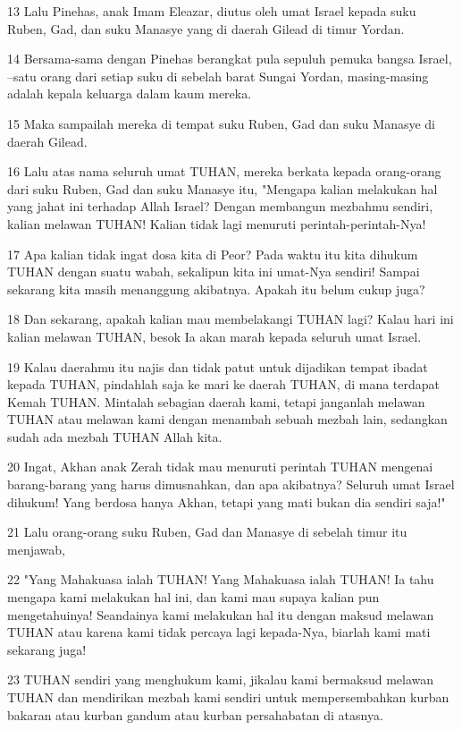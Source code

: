 \par 13 Lalu Pinehas, anak Imam Eleazar, diutus oleh umat Israel kepada suku Ruben, Gad, dan suku Manasye yang di daerah Gilead di timur Yordan.
\par 14 Bersama-sama dengan Pinehas berangkat pula sepuluh pemuka bangsa Israel, --satu orang dari setiap suku di sebelah barat Sungai Yordan, masing-masing adalah kepala keluarga dalam kaum mereka.
\par 15 Maka sampailah mereka di tempat suku Ruben, Gad dan suku Manasye di daerah Gilead.
\par 16 Lalu atas nama seluruh umat TUHAN, mereka berkata kepada orang-orang dari suku Ruben, Gad dan suku Manasye itu, "Mengapa kalian melakukan hal yang jahat ini terhadap Allah Israel? Dengan membangun mezbahmu sendiri, kalian melawan TUHAN! Kalian tidak lagi menuruti perintah-perintah-Nya!
\par 17 Apa kalian tidak ingat dosa kita di Peor? Pada waktu itu kita dihukum TUHAN dengan suatu wabah, sekalipun kita ini umat-Nya sendiri! Sampai sekarang kita masih menanggung akibatnya. Apakah itu belum cukup juga?
\par 18 Dan sekarang, apakah kalian mau membelakangi TUHAN lagi? Kalau hari ini kalian melawan TUHAN, besok Ia akan marah kepada seluruh umat Israel.
\par 19 Kalau daerahmu itu najis dan tidak patut untuk dijadikan tempat ibadat kepada TUHAN, pindahlah saja ke mari ke daerah TUHAN, di mana terdapat Kemah TUHAN. Mintalah sebagian daerah kami, tetapi janganlah melawan TUHAN atau melawan kami dengan menambah sebuah mezbah lain, sedangkan sudah ada mezbah TUHAN Allah kita.
\par 20 Ingat, Akhan anak Zerah tidak mau menuruti perintah TUHAN mengenai barang-barang yang harus dimusnahkan, dan apa akibatnya? Seluruh umat Israel dihukum! Yang berdosa hanya Akhan, tetapi yang mati bukan dia sendiri saja!"
\par 21 Lalu orang-orang suku Ruben, Gad dan Manasye di sebelah timur itu menjawab,
\par 22 "Yang Mahakuasa ialah TUHAN! Yang Mahakuasa ialah TUHAN! Ia tahu mengapa kami melakukan hal ini, dan kami mau supaya kalian pun mengetahuinya! Seandainya kami melakukan hal itu dengan maksud melawan TUHAN atau karena kami tidak percaya lagi kepada-Nya, biarlah kami mati sekarang juga!
\par 23 TUHAN sendiri yang menghukum kami, jikalau kami bermaksud melawan TUHAN dan mendirikan mezbah kami sendiri untuk mempersembahkan kurban bakaran atau kurban gandum atau kurban persahabatan di atasnya.
